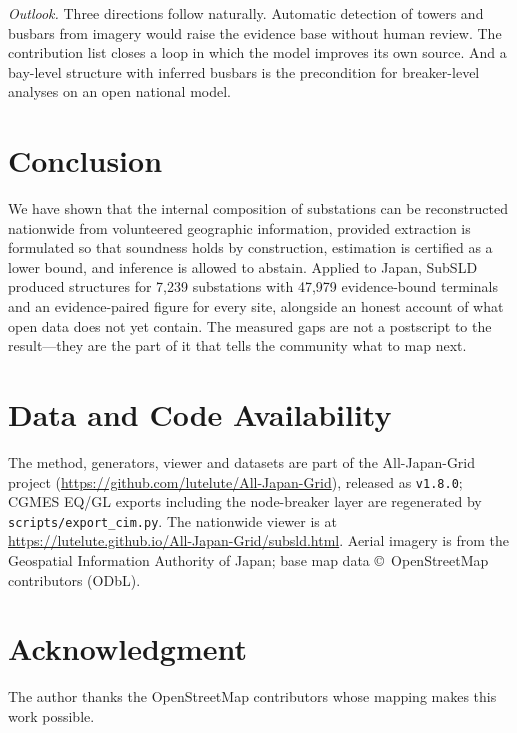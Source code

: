 \documentclass[journal]{IEEEtran}
\begin{document}
\emph{Outlook.} Three directions follow naturally. Automatic detection of towers
and busbars from imagery would raise the evidence base without human review.
The contribution list closes a loop in which the model improves its own source.
And a bay-level structure with inferred busbars is the precondition for
breaker-level analyses on an open national model.

\section{Conclusion}

We have shown that the internal composition of substations can be reconstructed
nationwide from volunteered geographic information, provided extraction is
formulated so that soundness holds by construction, estimation is certified as a
lower bound, and inference is allowed to abstain. Applied to Japan, SubSLD
produced structures for 7{,}239 substations with 47{,}979 evidence-bound
terminals and an evidence-paired figure for every site, alongside an honest
account of what open data does not yet contain. The measured gaps are not a
postscript to the result---they are the part of it that tells the community what
to map next.

\section*{Data and Code Availability}

The method, generators, viewer and datasets are part of the All-Japan-Grid
project (\url{https://github.com/lutelute/All-Japan-Grid}), released as
\texttt{v1.8.0}; CGMES EQ/GL exports including the node-breaker layer are
regenerated by \texttt{scripts/export\_cim.py}. The nationwide viewer is at
\url{https://lutelute.github.io/All-Japan-Grid/subsld.html}. Aerial imagery is
from the Geospatial Information Authority of Japan; base map data
\copyright\ OpenStreetMap contributors (ODbL).

\section*{Acknowledgment}

The author thanks the OpenStreetMap contributors whose mapping makes this work
possible.
\end{document}

